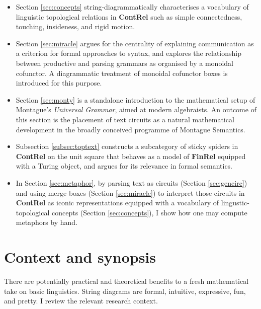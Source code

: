 \begin{myboxB}
\begin{itemize}
\item Section \ref{sec:concepts} string-diagrammatically characterises a vocabulary of linguistic topological relations in \textbf{ContRel} such as simple connectedness, touching, insideness, and rigid motion.

\item Section \ref{sec:miracle} argues for the centrality of explaining communication as a criterion for formal approaches to syntax, and explores the relationship between productive and parsing grammars as organised by a monoidal cofunctor. A diagrammatic treatment of monoidal cofunctor boxes is introduced for this purpose.

\item Section \ref{sec:monty} is a standalone introduction to the mathematical setup of Montague's \emph{Universal Grammar}, aimed at modern algebraists. An outcome of this section is the placement of text circuits as a natural mathematical development in the broadly conceived programme of Montague Semantics.

\item Subsection \ref{subsec:toptext} constructs a subcategory of sticky spiders in \textbf{ContRel} on the unit square that behaves as a model of \textbf{FinRel} equipped with a Turing object, and argues for its relevance in formal semantics.

\item In Section \ref{sec:metaphor}, by parsing text as circuits (Section \ref{sec:gencirc}) and using merge-boxes (Section \ref{sec:miracle}) to interpret those circuits in \textbf{ContRel} as iconic representations equipped with a vocabulary of lingustic-topological concepts (Section \ref{sec:concepts}), I show how one may compute metaphors by hand.

\end{itemize}
\end{myboxB}
\vfill
\clearpage
\clearpage
\newpage

\setcounter{chapter}{-1}
\chapter{Context and synopsis}
There are potentially practical and theoretical benefits to a fresh mathematical take on basic linguistics. String diagrams are formal, intuitive, expressive, fun, and pretty. I review the relevant research context.
\clearpage
\newpage

\clearpage
\newpage
\label{sec:proctheory}
\clearpage
\newpage


